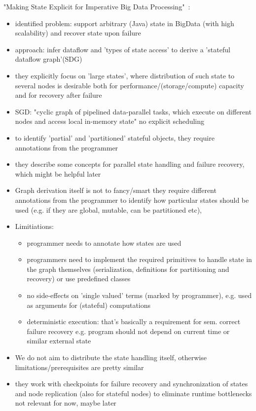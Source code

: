 "Making State Explicit for Imperative Big Data Processing"~\cite{fernandez2014making}:
\begin{itemize}
    \item identified problem: support arbitrary (Java) state in BigData (with high scalability) and recover state upon failure
    \item approach: infer dataflow and 'types of state access' to derive a 'stateful dataflow graph'(SDG)
    \item they explicitly focus on 'large states', where distribution of such state to several nodes is desirable both for performance/(storage/compute) capacity and for recovery after failure 
    \item SGD: "cyclic graph of pipelined data-parallel tasks, which execute on different nodes and access local in-memory state" \means no explicit scheduling
\item to identify 'partial' and 'partitioned' stateful objects, they require annotations from the programmer
\item they describe some concepts for parallel state handling and failure recovery, which might be helpful later
\item Graph derivation itself is not to fancy/smart \means  they require different annotations from the programmer to identify how particular states should be used (e.g. if they are global, mutable, can be partitioned etc), 
\item Limitiations:
\begin{itemize}
    \item programmer needs to annotate how states are used
    \item programmers need to implement the required primitives to handle state in the graph themselves (serialization, definitions for partitioning and recovery) or use predefined classes
    \item no side-effects on 'single valued' terms (marked by programmer), e.g. used as arguments for (stateful) computations
    \item deterministic execution: that's basically a requirement for sem. correct failure recovery e.g. program should not depend on current time or similar external state 
\end{itemize}
\item We do not aim to distribute the state handling itself, otherwise limitations/prerequisites are pretty similar
\item they work with checkpoints for failure recovery and synchronization of states and node replication (also for stateful nodes) to eliminate runtime bottlenecks \means not relevant for now, maybe later
\end{itemize}

